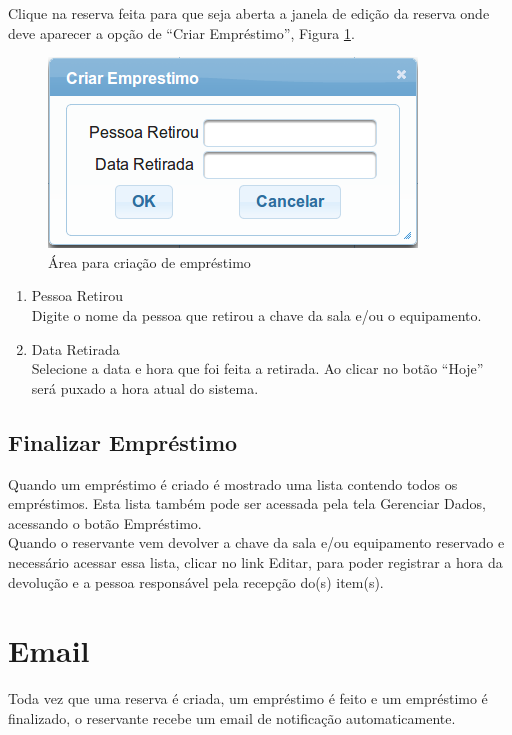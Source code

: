 \documentclass[openany,10pt,a4paper]{book}
\begin{document}
 Clique na reserva feita para que seja aberta a janela de edição da reserva onde deve aparecer a opção de ``Criar Empréstimo'', Figura \ref{im_criarEmprestimo}.

\begin{figure}[!htb]
    \centering
    \includegraphics[scale=0.45]{criarEmprestimo.png}
    \caption{Área para criação de empréstimo}
    \label{im_criarEmprestimo}
\end{figure}

\begin{enumerate}
\item{Pessoa Retirou}\\
Digite o nome da pessoa que retirou a chave da sala e/ou o equipamento.
\item{Data Retirada}\\
Selecione a data e hora que foi feita a retirada. Ao clicar no botão ``Hoje'' será puxado a hora atual do sistema.
\end{enumerate}

\subsection{Finalizar Empréstimo}
Quando um empréstimo é criado é  mostrado uma lista contendo todos os empréstimos. Esta lista também pode ser acessada pela tela Gerenciar Dados, acessando o botão Empréstimo.\\
Quando o reservante vem devolver a chave da sala e/ou equipamento reservado e necessário acessar essa lista, clicar no link Editar, para poder registrar a hora da devolução e a pessoa responsável pela recepção do(s) item(s).


\section{Email}
Toda vez que uma reserva é criada, um empréstimo é feito e um empréstimo é finalizado, o reservante recebe um email de notificação automaticamente.
\end{document}
